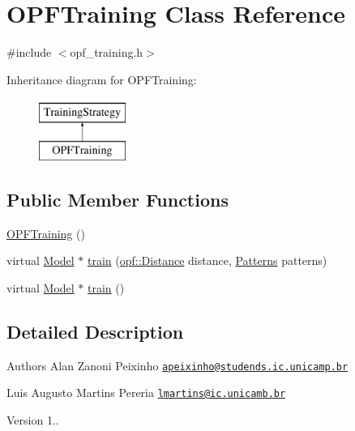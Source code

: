 \hypertarget{classOPFTraining}{\section{O\+P\+F\+Training Class Reference}
\label{classOPFTraining}
}


{\ttfamily \#include $<$opf\+\_\+training.\+h$>$}

Inheritance diagram for O\+P\+F\+Training\+:\begin{figure}[H]
\begin{center}
\leavevmode
\includegraphics[height=2.000000cm]{classOPFTraining}
\end{center}
\end{figure}
\subsection*{Public Member Functions}
\begin{DoxyCompactItemize}
\item 
\hyperlink{classOPFTraining_a901f7f1c7f467dcfee5678fc4b6bfbd4}{O\+P\+F\+Training} ()
\item 
virtual \hyperlink{classModel}{Model} $\ast$ \hyperlink{classOPFTraining_a7ccc8643c9f973f7323cd6622b0bf616}{train} (\hyperlink{namespaceopf_a61631393754e0aa6aaeacf0767b2b419}{opf\+::\+Distance} distance, \hyperlink{classPatterns}{Patterns} patterns)
\item 
virtual \hyperlink{classModel}{Model} $\ast$ \hyperlink{classTrainingStrategy_ad5da56b8b57e010c97a782d9e629e2b5}{train} ()
\end{DoxyCompactItemize}


\subsection{Detailed Description}
\begin{DoxyAuthor}{Authors}
Alan Zanoni Peixinho \href{mailto:apeixinho@studends.ic.unicamp.br}{\tt apeixinho@studends.\+ic.\+unicamp.\+br} 

Luis Augusto Martins Pereria \href{mailto:lmartins@ic.unicamb.br}{\tt lmartins@ic.\+unicamb.\+br} 
\end{DoxyAuthor}
\begin{DoxyVersion}{Version}
1.. 
\end{DoxyVersion}


